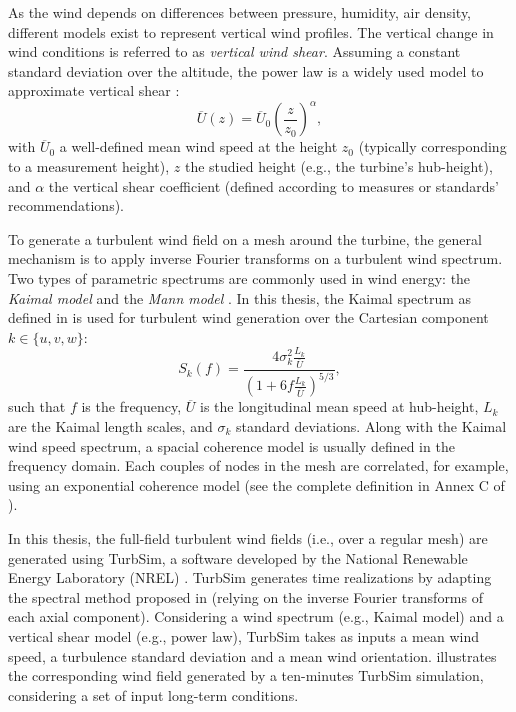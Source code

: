 As the wind depends on differences between pressure, humidity, air density, different models exist to represent vertical wind profiles. 
The vertical change in wind conditions is referred to as \textit{vertical wind shear}. 
Assuming a constant standard deviation over the altitude, the power law is a widely used model to approximate vertical shear \citep{iec_2019}:
\begin{equation}
    \overline{U}(z) = \overline{U}_0 \left(\frac{z}{z_{\mathrm{0}}}\right)^\alpha,
\end{equation}
with $\overline{U}_0$ a well-defined mean wind speed at the height $z_{\mathrm{0}}$ (typically corresponding to a measurement height), 
$z$ the studied height (e.g., the turbine's hub-height), and $\alpha$ the vertical shear coefficient (defined according to measures or standards' recommendations). 

To generate a turbulent wind field on a mesh around the turbine, the general mechanism is to apply inverse Fourier transforms on a turbulent wind spectrum.  
Two types of parametric spectrums are commonly used in wind energy: the \textit{Kaimal model} \citep{kaimal_1972} and the \textit{Mann model} \citep{mann_1998}. 
In this thesis, the Kaimal spectrum as defined in \cite{iec_2019} is used for turbulent wind generation over the Cartesian component $k \in \{u, v, w\}$:
\begin{equation}
    S_k(f) = \frac{4 \sigma_k^2 \frac{L_k}{\overline{U}}}{\left(1 + 6 f \frac{L_k}{\overline{U}}\right)^{5/3}},
    \label{eq:kaimal}
\end{equation} 
such that $f$ is the frequency, $\overline{U}$ is the longitudinal mean speed at hub-height, $L_k$ are the Kaimal length scales, and $\sigma_k$ standard deviations. 
Along with the Kaimal wind speed spectrum, a spacial coherence model is usually defined in the frequency domain. 
Each couples of nodes in the mesh are correlated, for example, using an exponential coherence model (see the complete definition in Annex C of \citealt{iec_2019}).

In this thesis, the full-field turbulent wind fields (i.e., over a regular mesh) are generated using TurbSim, a software developed by the National Renewable Energy Laboratory (NREL) \citep{turbsim_2009}. 
TurbSim generates time realizations by adapting the spectral method proposed in \citet{veers_1988_sandia} (relying on the inverse Fourier transforms of each axial component).   
Considering a wind spectrum (e.g., Kaimal model) and a vertical shear model (e.g., power law), TurbSim takes as inputs a mean wind speed, a turbulence standard deviation and a mean wind orientation. 
 illustrates the corresponding wind field generated by a ten-minutes TurbSim simulation, considering a set of input long-term conditions. 

